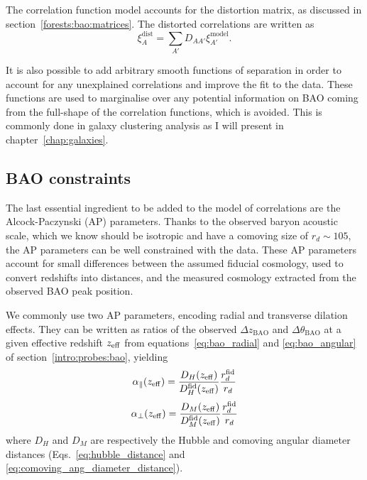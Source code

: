 The correlation function model accounts for the distortion 
matrix, as discussed in section~\ref{forests:bao:matrices}. 
The distorted correlations are written as
\begin{equation}
    \xi^\mathrm{ dist}_A = \sum_{A'} D_{AA'} \xi^\mathrm{ model}_{A'}.
    \label{eq:xi_distorted}
\end{equation}  

It is also possible to add arbitrary smooth functions of separation
in order to account for any unexplained correlations and improve the fit
to the data. These functions are used to marginalise over any potential 
information on BAO coming from the full-shape of the correlation functions, 
which is avoided. This is commonly done in galaxy clustering analysis 
as I will present in chapter~\ref{chap:galaxies}.


\subsection{BAO constraints}
\label{forests:bao:constraints}

The last essential ingredient to be added to the model of correlations
are the Alcock-Paczynski (AP) parameters. 
Thanks to the observed baryon acoustic scale, which we know should be isotropic and 
have a comoving size of $r_d \sim 105$\hmpc, the AP parameters can be well 
constrained with the data. These AP parameters account for small differences between 
the assumed fiducial cosmology, used to convert redshifts into distances, 
and the measured cosmology extracted from the observed BAO peak position.

We commonly use two AP parameters, encoding radial and transverse dilation 
effects. They can be written as ratios of the observed $\Delta z_\mathrm{BAO}$
and $\Delta \theta_\mathrm{BAO}$ at a given effective redshift $z_\mathrm{eff}$ 
from equations~\ref{eq:bao_radial} and \ref{eq:bao_angular}
of section~\ref{intro:probes:bao}, yielding
\begin{equation}  
    {\alpha_\parallel}(z_\mathrm{eff}) = \frac{D_H(z_\mathrm{eff})}{D_H^\mathrm{fid}(z_\mathrm{eff})} \frac{r_d^\mathrm{fid} }{r_d}
    \label{eq:alpha_parallel}
\end{equation}
\begin{equation}  
    {\alpha_\perp}(z_\mathrm{eff}) = \frac{D_M(z_\mathrm{eff})}{D_M^\mathrm{fid}(z_\mathrm{eff})} \frac{r_d^\mathrm{fid} }{r_d}
    \label{eq:alpha_perp}
\end{equation}
where $D_H$ and $D_M$ are respectively the Hubble and comoving angular diameter distances
(Eqs.~\ref{eq:hubble_distance} and \ref{eq:comoving_ang_diameter_distance}).

